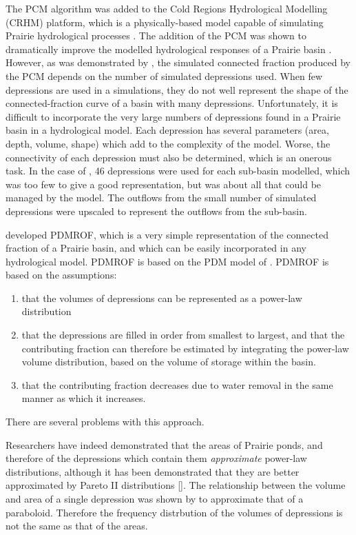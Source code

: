 \documentclass[draft,linenumbers]{agujournal2018}
\begin{document}
The PCM algorithm was added to the Cold Regions Hydrological Modelling
(CRHM) platform, which is a physically-based model capable of simulating
Prairie hydrological processes
\citep{pomeroyColdRegionsHydrological2007d}. The addition of the PCM was
shown to dramatically improve the modelled hydrological responses of a
Prairie basin \citep{pomeroyImprovingTestingPrairie2014}. However, as
was demonstrated by \citet{shookMemoryEffectsDepressional2011}, the
simulated connected fraction produced by the PCM depends on the number
of simulated depressions used. When few depressions are used in a
simulations, they do not well represent the shape of the
connected-fraction curve of a basin with many depressions.
Unfortunately, it is difficult to incorporate the very large numbers of
depressions found in a Prairie basin in a hydrological model. Each
depression has several parameters (area, depth, volume, shape) which add
to the complexity of the model. Worse, the connectivity of each
depression must also be determined, which is an onerous task. In the
case of \citet{pomeroyImprovingTestingPrairie2014}, 46 depressions were
used for each sub-basin modelled, which was too few to give a good
representation, but was about all that could be managed by the model.
The outflows from the small number of simulated depressions were
upscaled to represent the outflows from the sub-basin.

\citet{mekonnenImprovedLandSurface2014} developed PDMROF, which is a
very simple representation of the connected fraction of a Prairie basin,
and which can be easily incorporated in any hydrological model. PDMROF
is based on the PDM model of \citet{moorePDMRainfallrunoffModel2007a}.
PDMROF is based on the assumptions:

\begin{enumerate}
\item
  that the volumes of depressions can be represented as a power-law
  distribution
\item
  that the depressions are filled in order from smallest to largest, and
  that the contributing fraction can therefore be estimated by
  integrating the power-law volume distribution, based on the volume of
  storage within the basin.
\item
  that the contributing fraction decreases due to water removal in the
  same manner as which it increases.
\end{enumerate}

There are several problems with this approach.

Researchers have indeed demonstrated that the areas of Prairie ponds,
and therefore of the depressions which contain them \emph{approximate}
power-law distributions, although it has been demonstrated that they are
better approximated by Pareto II distributions {[}{]}. The relationship
between the volume and area of a single depression was shown by
\citep{hayashiSimpleEquationsRepresent2000} to approximate that of a
paraboloid. Therefore the frequency distrbution of the volumes of
depressions is not the same as that of the areas.
\end{document}
